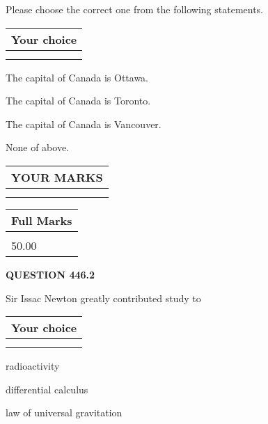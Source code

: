 \documentclass[12pt]{article}
\begin{document}
  
Please choose the correct one from the following statements.
  
  
\noindent\hspace{3.0in} \begin{tabular}{|l|}
\hline
Your choice \\
\hline
 \\ 
 \\ 
\hline
\end{tabular}
  
  
 
 
The capital of Canada is Ottawa.
 
 
The capital of Canada is Toronto.
 
 
The capital of Canada is Vancouver.
 
 
 None of above.
 
 
  
\vspace{0.2in}
  
\noindent\begin{tabular}{|l|}
\hline
 YOUR MARKS  \\
\hline
 \\ 
 \\ 
\hline
\end{tabular}
\hspace{0.05in} \begin{tabular}{|l|}
\hline
 Full Marks  \\
\hline
 \\ 
50.00 \\
\hline
\end{tabular}
{\textbf{\Large{QUESTION
446.2 
}}}
  
  
Sir Issac Newton greatly contributed study to
  
  
\noindent\hspace{3.0in} \begin{tabular}{|l|}
\hline
Your choice \\
\hline
 \\ 
 \\ 
\hline
\end{tabular}
  
  
 
 
radioactivity
 
 
differential calculus
 
 
law of universal gravitation
 
\end{document}
